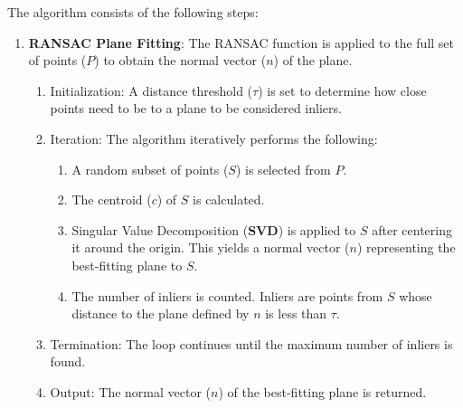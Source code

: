 The algorithm consists of the following steps:

\begin{enumerate}
    \item \textbf{RANSAC Plane Fitting}: The RANSAC function is applied to the full set of points ($P$) 
    to obtain the normal vector ($n$) of the plane.
        \begin{enumerate}
            \item Initialization: A distance threshold ($\tau$) is set to determine how close points need to be to a plane
            to be considered inliers.
            \item Iteration: The algorithm iteratively performs the following:
                \begin{enumerate}
                    \item A random subset of points ($S$) is selected from $P$.
                    \item The centroid ($c$) of $S$ is calculated.
                    \item Singular Value Decomposition (\textbf{SVD}) is applied to $S$ after centering it around the origin. 
                    This yields a normal vector ($n$) representing the best-fitting plane to $S$.
                    \item The number of inliers is counted. Inliers are points from $S$ whose distance to the plane 
                    defined by $n$ is less than $\tau$.
                \end{enumerate}
            \item Termination: The loop continues until the maximum number of inliers is found.
            \item Output: The normal vector ($n$) of the best-fitting plane is returned.
        \end{enumerate}


\end{enumerate}
